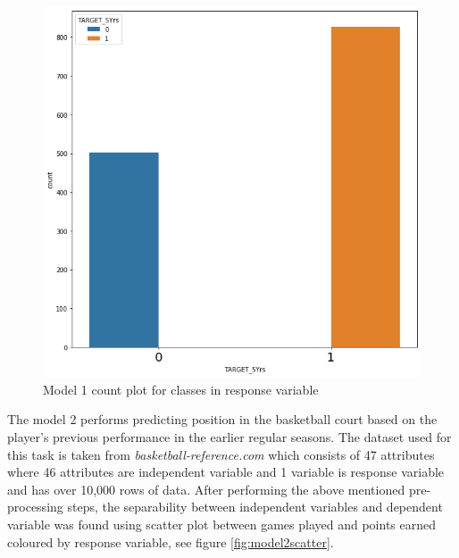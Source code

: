 \documentclass[format=sigconf]{acmart}
\begin{document}
\begin{figure}[H]
    \centering
    \includegraphics[scale=0.25]{images/model_1_bar_plot.png}
    \caption{Model 1 count plot for classes in response variable}
    \label{fig:model1bar}
\end{figure}
The model 2 performs predicting position in the basketball court based on the player's previous performance in the earlier regular 
seasons. The dataset used for this task is taken from \textit{basketball-reference.com} which consists of 47 attributes where 46 
attributes are independent variable and 1 variable is response variable and has over 10,000 rows of data. After performing the above 
mentioned pre-processing steps, the separability between independent variables and dependent variable was found using scatter plot
between games played and points earned coloured by response variable, see figure \ref{fig:model2scatter}.
\end{document}
